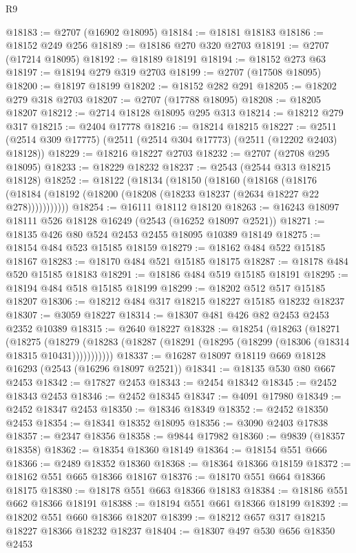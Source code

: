 \begin{lexlean}{R9}
\begin{coremodule}
@18183 := @2707 (@16902 @18095)
@18184 := @18181 @18183
@18186 := @18152 @249 @256
@18189 := @18186 @270 @320 @2703
@18191 := @2707 (@17214 @18095)
@18192 := @18189 @18191
@18194 := @18152 @273 @63
@18197 := @18194 @279 @319 @2703
@18199 := @2707 (@17508 @18095)
@18200 := @18197 @18199
@18202 := @18152 @282 @291
@18205 := @18202 @279 @318 @2703
@18207 := @2707 (@17788 @18095)
@18208 := @18205 @18207
@18212 := @2714 @18128 @18095 @295 @313
@18214 := @18212 @279 @317
@18215 := @2404 @17778
@18216 := @18214 @18215
@18227 := @2511 (@2514 @309 @17775) (@2511 (@2514 @304 @17773) (@2511 (@12202 @2403) @18128))
@18229 := @18216 @18227 @2703
@18232 := @2707 (@2708 @295 @18095)
@18233 := @18229 @18232
@18237 := @2543 (@2544 @313 @18215 @18128)
@18252 := @18122
    (@18134
      (@18150
        (@18160
          (@18168
            (@18176 (@18184 (@18192 (@18200 (@18208 (@18233 @18237 (@2634 @18227 @22 @278)))))))))))
@18254 := @16111 @18112 @18120
@18263 := @16243 @18097 @18111 @526 @18128 @16249 (@2543 (@16252 @18097 @2521))
@18271 := @18135 @426 @80 @524 @2453 @2455 @18095 @10389 @18149
@18275 := @18154 @484 @523 @15185 @18159
@18279 := @18162 @484 @522 @15185 @18167
@18283 := @18170 @484 @521 @15185 @18175
@18287 := @18178 @484 @520 @15185 @18183
@18291 := @18186 @484 @519 @15185 @18191
@18295 := @18194 @484 @518 @15185 @18199
@18299 := @18202 @512 @517 @15185 @18207
@18306 := @18212 @484 @317 @18215 @18227 @15185 @18232 @18237
@18307 := @3059 @18227
@18314 := @18307 @481 @426 @82 @2453 @2453 @2352 @10389
@18315 := @2640 @18227
@18328 := @18254
    (@18263
      (@18271
        (@18275
          (@18279 (@18283 (@18287 (@18291 (@18295 (@18299 (@18306 (@18314 @18315 @10431)))))))))))
@18337 := @16287 @18097 @18119 @669 @18128 @16293 (@2543 (@16296 @18097 @2521))
@18341 := @18135 @530 @80 @667 @2453
@18342 := @17827 @2453
@18343 := @2454 @18342
@18345 := @2452 @18343 @2453
@18346 := @2452 @18345
@18347 := @4091 @17980
@18349 := @2452 @18347 @2453
@18350 := @18346 @18349
@18352 := @2452 @18350 @2453
@18354 := @18341 @18352 @18095
@18356 := @3090 @2403 @17838
@18357 := @2347 @18356
@18358 := @9844 @17982
@18360 := @9839 (@18357 @18358)
@18362 := @18354 @18360 @18149
@18364 := @18154 @551 @666
@18366 := @2489 @18352 @18360
@18368 := @18364 @18366 @18159
@18372 := @18162 @551 @665 @18366 @18167
@18376 := @18170 @551 @664 @18366 @18175
@18380 := @18178 @551 @663 @18366 @18183
@18384 := @18186 @551 @662 @18366 @18191
@18388 := @18194 @551 @661 @18366 @18199
@18392 := @18202 @551 @660 @18366 @18207
@18399 := @18212 @657 @317 @18215 @18227 @18366 @18232 @18237
@18404 := @18307 @497 @530 @656 @18350 @2453

\end{coremodule}
\end{lexlean}
